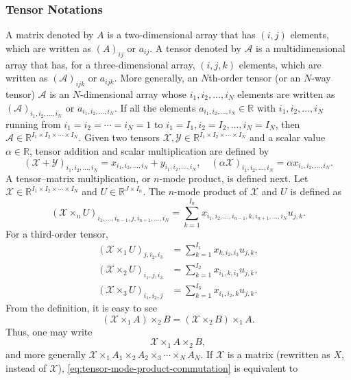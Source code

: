 \subsubsection{{Tensor Notations}}\label{subsec:tensor-notations}
{A matrix denoted by $A$ is a two-dimensional array that has $(i,j)$ elements, which are written as $(A)_{ij}$ or $a_{ij}$. A tensor denoted by $\mathcal{A}$ is a multidimensional array that has, for a three-dimensional array, $(i,j,k)$ elements, which are written as $(\mathcal{A})_{ijk}$ or $a_{ijk}$. More generally, an $N$th-order tensor (or an $N$-way tensor) $\mathcal{A}$ is an $N$-dimensional array whose $i_1,i_2,\ldots,i_N$ elements are written as $(\mathcal{A})_{i_1,i_2,\ldots,i_N}$ or $a_{i_1,i_2,\ldots,i_N}$. If all the elements $a_{i_1,i_2,\ldots,i_N}\in\mathbb{R}$ with $i_1,i_2,\ldots,i_N$ running from $i_1=i_2=\cdots=i_N=1$ to $i_1=I_1,i_2=I_2,\ldots,i_N=I_N$, then $\mathcal{A}\in\mathbb{R}^{I_1\times I_2\times\cdots\times I_N}$.}
{Given two tensors $\mathcal{X},\mathcal{Y}\in\mathbb{R}^{I_1\times I_2\times\cdots\times I_N}$ and a scalar value $\alpha\in\mathbb{R}$, tensor addition and scalar multiplication are defined by}
\[(\mathcal{X}+\mathcal{Y})_{i_1,i_2,\ldots,i_N}=x_{i_1,i_2,\ldots,i_N}+y_{i_1,i_2,\ldots,i_N},\quad
(\alpha\mathcal{X})_{i_1,i_2,\ldots,i_N}=\alpha x_{i_1,i_2,\ldots,i_N}.\]
{A tensor--matrix multiplication, or $n$-mode product, is defined next. Let $\mathcal{X}\in\mathbb{R}^{I_1\times I_2\times\cdots\times I_N}$ and $U\in\mathbb{R}^{J\times I_n}$. The $n$-mode product of $\mathcal{X}$ and $U$ is defined as}
\[(\mathcal{X}\times_nU)_{i_1,\ldots,i_{n-1},j,i_{n+1},\ldots,i_N}
=\sum_{k=1}^{I_n}x_{i_1,i_2,\ldots,i_{n-1},k,i_{n+1},\ldots,i_N}u_{j,k}.\]
{For a third-order tensor,}
\[\begin{aligned}
(\mathcal{X}\times_1U)_{j,i_2,i_3}&=\sum_{k=1}^{I_1}x_{k,i_2,i_3}u_{j,k},\\
(\mathcal{X}\times_2U)_{i_1,j,i_3}&=\sum_{k=1}^{I_2}x_{i_1,k,i_3}u_{j,k},\\
(\mathcal{X}\times_3U)_{i_1,i_2,j}&=\sum_{k=1}^{I_3}x_{i_1,i_2,k}u_{j,k}.
\end{aligned}\]
{From the definition, it is easy to see}
\begin{equation}\label{eq:tensor-mode-product-commutation}
(\mathcal{X}\times_1A)\times_2B=(\mathcal{X}\times_2B)\times_1A.
\end{equation}
{Thus, one may write}
\[\mathcal{X}\times_1A\times_2B,\]
{and more generally $\mathcal{X}\times_1A_1\times_2A_2\times_3\cdots\times_NA_N$. If $\mathcal{X}$ is a matrix (rewritten as $X$, instead of $\mathcal{X}$), \eqref{eq:tensor-mode-product-commutation} is equivalent to}
